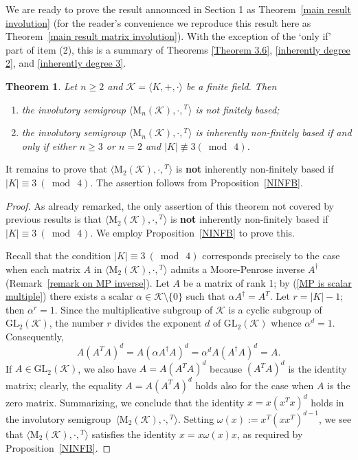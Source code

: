 \documentclass[11pt,reqno]{amsart}
\numberwithin{equation}{section}
\newtheorem{Thm}{Theorem}[section]
\theoremstyle{remark}
\def\om{\omega}
\def\sm{semi\-group}
\begin{document}
We are ready to prove the result announced in Section 1 as
Theorem~\ref{main result involution} (for the reader's convenience
we reproduce this result here as Theorem~\ref{main result matrix
involution}). With the exception of the `only if' part of item
(2), this is a summary of Theorems \ref{Theorem 3.6},
\ref{inherently degree 2}, and \ref{inherently degree 3}.
\begin{Thm}\label{main result matrix involution} Let $n\ge 2$ and
$\mathcal{K}=\langle K,+,\cdot\rangle$ be a finite field. Then
\begin{enumerate}
\item the involutory semigroup $\langle \mathrm{M}_n(\mathcal{K}),\cdot,{}^T\rangle$
is not finitely based;
\item the involutory semigroup $\langle \mathrm{M}_n(\mathcal{K}),\cdot,{}^T\rangle$
is inherently non-finitely ba\-sed if and only if either $n\ge 3$ or $n=2$ and $\vert K\vert\mathrel{\not\equiv 3}
(\bmod\ 4)$.
\end{enumerate}
\end{Thm}

It remains to prove that $\langle\mathrm{M}_2(\mathcal{K}),\cdot,{}^T\rangle$ is \textbf{not} inherently non-finitely
based if $\vert K\vert\equiv 3\ (\bmod\ 4)$. The assertion follows from Proposition~\ref{NINFB}.

\begin{proof}
As already remarked, the only assertion of this theorem not covered by previous results is that
$\langle\mathrm{M}_2(\mathcal{K}),\cdot,{}^T\rangle$ is \textbf{not} inherently non-finitely based if $\vert
K\vert\equiv 3\ (\bmod\ 4)$. We employ Proposition~\ref{NINFB} to prove this.

Recall that the condition $\vert K\vert\equiv 3\ (\bmod\ 4)$ corresponds precisely to the case when each matrix $A$ in
$\langle\mathrm{M}_2(\mathcal{K}),\cdot,{}^T\rangle$ admits a Moore-Penrose inverse $A^\dag$ (Remark~\ref{remark on MP
inverse}). Let $A$ be a matrix of rank 1; by (\ref{MP is scalar multiple}) there exists a scalar $\alpha\in
\mathcal{K}\setminus\{0\}$ such that $\alpha A^\dag= A^T$. Let $r=\vert K\vert -1$; then $\alpha^r=1$. Since the
multiplicative subgroup of $\mathcal{K}$ is a cyclic subgroup of $\mathrm{GL}_2(\mathcal{K})$, the number $r$ divides
the exponent $d$ of $\mathrm{GL}_2(\mathcal{K})$ whence $\alpha^d=1$. Consequently,
$$A(A^TA)^d= A(\alpha A^\dag A)^d=\alpha^d A(A^\dag A)^d=A.$$
If $A\in\mathrm{GL}_2(\mathcal{K})$, we also have $A=A(A^TA)^d$ because $(A^TA)^d$ is the identity matrix; clearly, the
equality $A=A(A^TA)^d$ holds also for the case when $A$ is the zero matrix. Summarizing, we conclude that the identity
$x=x(x^Tx)^d$ holds in the involutory \sm\ $\langle\mathrm{M}_2(\mathcal{K}),\cdot,{}^T\rangle$. Setting
$\om(x):=x^T(xx^T)^{d-1}$, we see that $\langle\mathrm{M}_2(\mathcal{K}),\cdot,{}^T\rangle$ satisfies the identity
$x=x\om(x)x$, as required by Proposition~\ref{NINFB}.
\end{proof}
\end{document}
